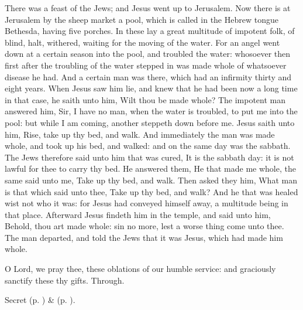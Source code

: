  There was a feast of the Jews; and Jesus went up to Jerusalem. Now there is at Jerusalem by the sheep market a pool, which is called in the Hebrew tongue Bethesda, having five porches. In these lay a great multitude of impotent folk, of blind, halt, withered, waiting for the moving of the water. For an angel went down at a certain season into the pool, and troubled the water: whosoever then first after the troubling of the water stepped in was made whole of whatsoever disease he had. And a certain man was there, which had an infirmity thirty and eight years. When Jesus saw him lie, and knew that he had been now a long time in that case, he saith unto him, Wilt thou be made whole? The impotent man answered him, Sir, I have no man, when the water is troubled, to put me into the pool: but while I am coming, another steppeth down before me. Jesus saith unto him, Rise, take up thy bed, and walk. And immediately the man was made whole, and took up his bed, and walked: and on the same day was the sabbath. The Jews therefore said unto him that was cured, It is the sabbath day: it is not lawful for thee to carry thy bed. He answered them, He that made me whole, the same said unto me, Take up thy bed, and walk. Then asked they him, What man is that which said unto thee, Take up thy bed, and walk? And he that was healed wist not who it was: for Jesus had conveyed himself away, a multitude being in that place. Afterward Jesus findeth him in the temple, and said unto him, Behold, thou art made whole: sin no more, lest a worse thing come unto thee. The man departed, and told the Jews that it was Jesus, which had made him whole.


\secret
{} O Lord, we pray thee, these oblations of our humble service: and graciously sanctify these thy gifts. Through.


\begin{rubric}
     Secret  (p. \pageref{AshWednesdayMassSecret}) \&   (p. \pageref{SPLivingDeparted}).
\end{rubric}


